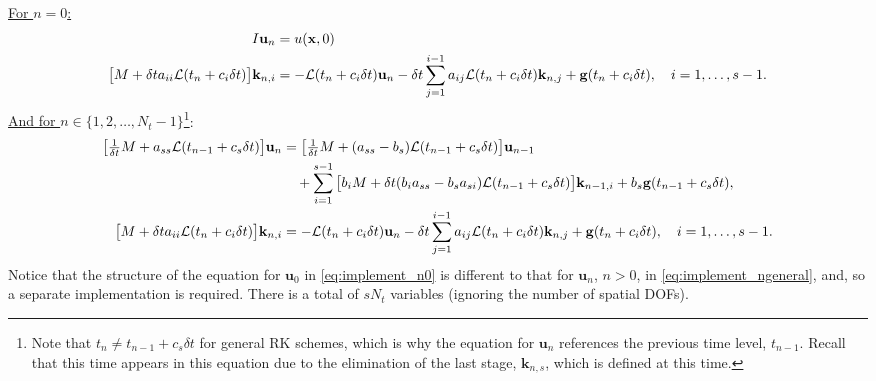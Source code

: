 \documentclass[a4paper,10pt]{article}
\begin{document}
\noindent \underline{For $n = 0$:}
\begin{align}
\label{eq:implement_n0}
\begin{split}
I \mathbf{u}_n &= u(\mathbf{x},0) \\
\big[ M + \delta t a_{ii} {\cal L}(t_n + c_i \delta t) \big] \mathbf{k}_{n,i} 
&= 
- {\cal L}(t_n + c_i \delta t) \mathbf{u}_{n} 
- \delta t \sum \limits_{j = 1}^{i-1} a_{ij} {\cal L}(t_n + c_i \delta t) \mathbf{k}_{n,j} 
+ \mathbf{g}(t_n + c_i \delta t),
\quad
i = 1,\ldots,s-1.
\end{split}
\end{align}
\underline{And for $n \in \{1,2,\ldots,N_t-1\}$}\footnote{Note that $t_n \neq t_{n-1} + c_s \delta t $ for general RK schemes, which is why the equation for $\mathbf{u}_n$ references the previous time level, $t_{n-1}$. Recall that this time appears in this equation due to the elimination of the last stage, $\mathbf{k}_{n,s}$, which is defined at this time.}:
\begin{align} 
\label{eq:implement_ngeneral}
\begin{split}
\big[ 
\tfrac{1}{\delta t} M + a_{ss} {\cal L}(t_{n-1} + c_s \delta t) 
\big] 
\mathbf{u}_{n} 
&= 
\big[ 
\tfrac{1}{\delta t} M + ( a_{ss} - b_s) {\cal L}(t_{n-1} + c_s \delta t) 
\big] 
\mathbf{u}_{n-1} \\
&\quad
+ \sum \limits_{i = 1}^{s-1} 
\big[
b_i M + \delta t  (b_i a_{ss} - b_s a_{si}) {\cal L}(t_{n-1} + c_s \delta t)
\big] \mathbf{k}_{n-1,i}
+
b_s \mathbf{g}(t_{n-1} + c_s \delta t), \\
\big[ M + \delta t a_{ii} {\cal L}(t_n + c_i \delta t) \big] \mathbf{k}_{n,i} 
&= 
- {\cal L}(t_n + c_i \delta t) \mathbf{u}_{n} 
- \delta t \sum \limits_{j = 1}^{i-1} a_{ij} {\cal L}(t_n + c_i \delta t) \mathbf{k}_{n,j} 
+ \mathbf{g}(t_n + c_i \delta t),
\quad
i = 1,\ldots,s-1.
\end{split}
\end{align}
Notice that the structure of the equation for $\mathbf{u}_0$ in \eqref{eq:implement_n0} is different to that for $\mathbf{u}_n$, $n > 0$, in \eqref{eq:implement_ngeneral}, and, so a separate implementation is required. There is a total of $s N_t$ variables (ignoring the number of spatial DOFs).
\end{document}
